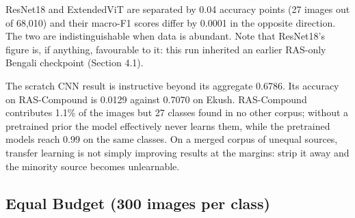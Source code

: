 ResNet18 and ExtendedViT are separated by 0.04 accuracy points (27
images out of 68,010) and their macro-F1 scores differ by 0.0001 in
the opposite direction. The two are indistinguishable when data is
abundant. Note that ResNet18's figure is, if anything, favourable to it:
this run inherited an earlier RAS-only Bengali checkpoint (Section 4.1).

The scratch CNN result is instructive beyond its aggregate 0.6786. Its
accuracy on RAS-Compound is 0.0129 against 0.7070 on Ekush.
RAS-Compound contributes 1.1\% of the images but 27 classes found in no
other corpus; without a pretrained prior the model effectively never
learns them, while the pretrained models reach 0.99 on the same classes.
On a merged corpus of unequal sources, transfer learning is not simply
improving results at the margins: strip it away and the minority source
becomes unlearnable.

\hypertarget{equal-budget-300-images-per-class}{%
\subsection{Equal Budget (300 images per
class)}\label{equal-budget-300-images-per-class}}

